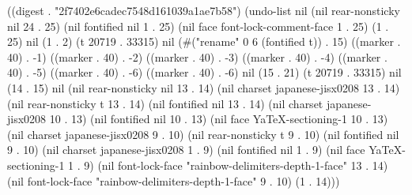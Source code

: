 
((digest . "2f7402e6cadec7548d161039a1ae7b58") (undo-list nil (nil rear-nonsticky nil 24 . 25) (nil fontified nil 1 . 25) (nil face font-lock-comment-face 1 . 25) (1 . 25) nil (1 . 2) (t 20719 . 33315) nil (#("rename" 0 6 (fontified t)) . 15) ((marker . 40) . -1) ((marker . 40) . -2) ((marker . 40) . -3) ((marker . 40) . -4) ((marker . 40) . -5) ((marker . 40) . -6) ((marker . 40) . -6) nil (15 . 21) (t 20719 . 33315) nil (14 . 15) nil (nil rear-nonsticky nil 13 . 14) (nil charset japanese-jisx0208 13 . 14) (nil rear-nonsticky t 13 . 14) (nil fontified nil 13 . 14) (nil charset japanese-jisx0208 10 . 13) (nil fontified nil 10 . 13) (nil face YaTeX-sectioning-1 10 . 13) (nil charset japanese-jisx0208 9 . 10) (nil rear-nonsticky t 9 . 10) (nil fontified nil 9 . 10) (nil charset japanese-jisx0208 1 . 9) (nil fontified nil 1 . 9) (nil face YaTeX-sectioning-1 1 . 9) (nil font-lock-face "rainbow-delimiters-depth-1-face" 13 . 14) (nil font-lock-face "rainbow-delimiters-depth-1-face" 9 . 10) (1 . 14)))
